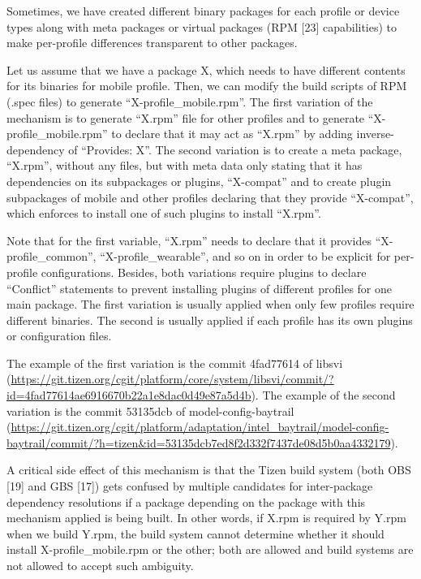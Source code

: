 Sometimes, we have created different binary packages for each profile or device types along with meta packages or virtual packages (RPM [23] capabilities) to make per-profile differences transparent to other packages.


Let us assume that we have a package X, which needs to have different contents for its binaries for mobile profile. Then, we can modify the build scripts of RPM (.spec files) to generate “X-profile\_mobile.rpm”. The first variation of the mechanism is to generate “X.rpm” file for other profiles and to generate “X-profile\_mobile.rpm” to declare that it may act as “X.rpm” by adding inverse-dependency of “Provides: X”. The second variation is to create a meta package, “X.rpm”, without any files, but with meta data only stating that it has dependencies on its subpackages or plugins, “X-compat” and to create plugin subpackages of mobile and other profiles declaring that they provide “X-compat”, which enforces to install one of such plugins to install “X.rpm”.


Note that for the first variable, “X.rpm” needs to declare that it provides “X-profile\_common”, “X-profile\_wearable”, and so on in order to be explicit for per-profile configurations. Besides, both variations require plugins to declare “Conflict” statements to prevent installing plugins of different profiles for one main package. The first variation is usually applied when only few profiles require different binaries. The second is usually applied if each profile has its own plugins or configuration files.


The example of the first variation is the commit 4fad77614 of libsvi (\url{https://git.tizen.org/cgit/platform/core/system/libsvi/commit/?id=4fad77614ae6916670b22a1e8dac0d49e87a5d4b}). The example of the second variation is the commit 53135dcb of model-config-baytrail (\url{https://git.tizen.org/cgit/platform/adaptation/intel_baytrail/model-config-baytrail/commit/?h=tizen&id=53135dcb7ed8f2d332f7437de08d5b0aa4332179}).


A critical side effect of this mechanism is that the Tizen build system (both OBS [19] and GBS [17]) gets confused by multiple candidates for inter-package dependency resolutions if a package depending on the package with this mechanism applied is being built. In other words, if X.rpm is required by Y.rpm when we build Y.rpm, the build system cannot determine whether it should install X-profile\_mobile.rpm or the other; both are allowed and build systems are not allowed to accept such ambiguity.


